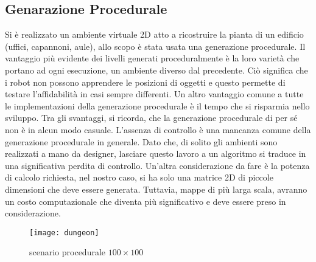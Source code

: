 \subsection{Genarazione Procedurale}
\label{ssec:generazioneproc}
Si è realizzato un ambiente virtuale 2D atto a ricostruire
la pianta di un edificio (uffici, capannoni, aule), allo scopo è stata usata una
generazione procedurale.
Il vantaggio più evidente dei livelli generati proceduralmente è la loro varietà
che portano ad ogni esecuzione, un ambiente diverso dal precedente.
Ciò significa che i robot non possono apprendere le posizioni di oggetti e
questo permette di testare l'affidabilità in casi sempre differenti.
Un altro vantaggio comune a tutte le implementazioni della generazione
procedurale è il tempo che si risparmia nello sviluppo.
Tra gli svantaggi, si ricorda, che la generazione procedurale di per sé non è
in alcun modo casuale.
L'assenza di controllo è una mancanza comune della generazione procedurale in
generale.
Dato che, di solito gli ambienti sono realizzati a mano da designer, lasciare
questo lavoro a un algoritmo si traduce in una significativa perdita di
controllo.
Un'altra considerazione da fare è la potenza di calcolo richiesta, nel nostro
caso, si ha solo una matrice 2D di piccole dimensioni che deve essere generata.
Tuttavia, mappe di più larga scala, avranno un costo computazionale che diventa
più significativo e deve essere preso in
considerazione.\cite{green2016procedural}

\begin{figure}[!htb]
	\centering
	\texttt{[image: dungeon]}
	\caption{scenario procedurale $100\times100$}
 	\label{fig:dungeon}
\end{figure}

